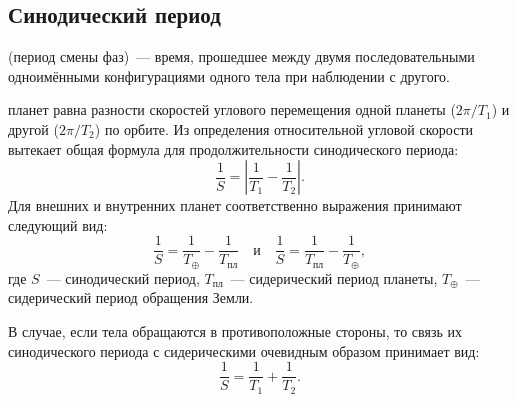 \subsection{Синодический период}

 (период смены фаз)~--- время, прошедшее между двумя последовательными одноимёнными конфигурациями одного тела при наблюдении с другого.

 планет равна 
разности скоростей углового перемещения одной планеты ($2\pi/T_1$) и другой ($2\pi/T_2 $) по орбите. Из определения относительной угловой скорости вытекает общая формула для продолжительности синодического периода: 
\begin{equation}
\frac1S=\left| \frac{1}{T_1}-\frac{1}{T_2} \right|.
\end{equation}
Для внешних и внутренних планет соответственно выражения принимают следующий вид: 
\begin{equation} \frac{1}{S} = \frac{1}{T_\oplus} - \frac{1}{T_\text{пл}} \quad \text{и} \quad \frac{1}{S} = \frac{1}{T_\text{пл}} - \frac{1}{T_\oplus},
\end{equation}
где $S$~--- синодический период, $T_\text{пл}$~--- сидерический период планеты, $T_\oplus$~--- сидерический период обращения Земли.

В случае, если тела обращаются в противоположные стороны, то связь 
их синодического периода с сидерическими очевидным образом принимает вид:
\begin{equation}
\frac{1}{S} = \frac{1}{T_1} + \frac{1}{T_2}.
\end{equation}